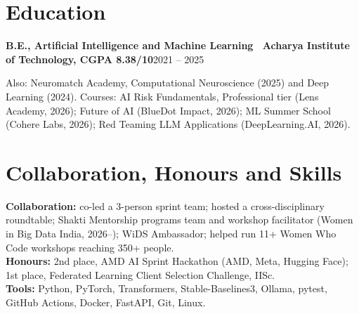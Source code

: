 \documentclass[10pt,a4paper]{article}
\newcommand{\entry}[2]{\textbf{#1}\hfill #2\par}
\begin{document}
\section{Education}
\entry{B.E., Artificial Intelligence and Machine Learning \textmd{\textendash\ Acharya Institute of Technology, CGPA 8.38/10}}{2021 -- 2025}
Also: Neuromatch Academy, Computational Neuroscience (2025) and Deep Learning (2024). Courses: AI Risk Fundamentals, Professional tier (Lens Academy, 2026); Future of AI (BlueDot Impact, 2026); ML Summer School (Cohere Labs, 2026); Red Teaming LLM Applications (DeepLearning.AI, 2026).

\section{Collaboration, Honours and Skills}
\textbf{Collaboration:} co-led a 3-person sprint team; hosted a cross-disciplinary roundtable; Shakti Mentorship programs team and workshop
facilitator (Women in Big Data India, 2026--); WiDS Ambassador; helped run 11+ Women Who Code workshops reaching 350+ people.\\
\textbf{Honours:} 2nd place, AMD AI Sprint Hackathon (AMD, Meta, Hugging Face); 1st place, Federated Learning Client Selection Challenge, IISc.\\
\textbf{Tools:} Python, PyTorch, Transformers, Stable-Baselines3, Ollama, pytest, GitHub Actions, Docker, FastAPI, Git, Linux.
\end{document}
